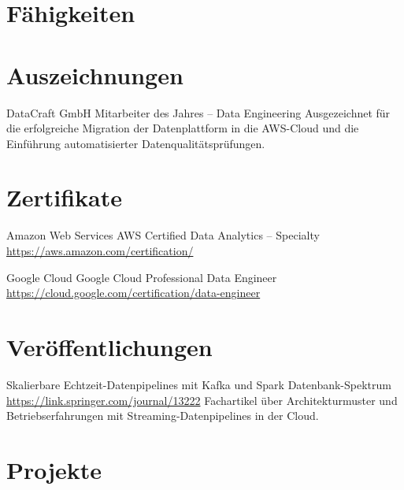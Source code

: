 \documentclass[a4paper, serif, 10pt]{moderncv}
\begin{document}
\section{Fähigkeiten}

\section{Auszeichnungen}

        {DataCraft GmbH}
        {Mitarbeiter des Jahres – Data Engineering}
        {}
        {}
        {Ausgezeichnet für die erfolgreiche Migration der Datenplattform in die AWS-Cloud und die Einführung automatisierter Datenqualitätsprüfungen.}
\section{Zertifikate}

        {Amazon Web Services}
        {AWS Certified Data Analytics – Specialty}
        {\url{https://aws.amazon.com/certification/}}
        {}
        {}

        {Google Cloud}
        {Google Cloud Professional Data Engineer}
        {\url{https://cloud.google.com/certification/data-engineer}}
        {}
        {}
\section{Veröffentlichungen}

        {Skalierbare Echtzeit-Datenpipelines mit Kafka und Spark}
        {Datenbank-Spektrum}
        {\url{https://link.springer.com/journal/13222}}
        {}
        {Fachartikel über Architekturmuster und Betriebserfahrungen mit Streaming-Datenpipelines in der Cloud.}
\section{Projekte}
\end{document}
